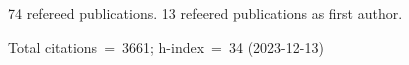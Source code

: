 74 refereed publications. 13 refeered publications as first author.

Total citations~=~3661; h-index~=~34 (2023-12-13)